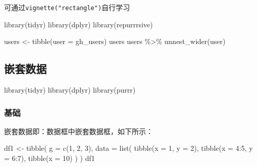 \documentclass[
]{book}
\newenvironment{Shaded}{\begin{snugshade}}{\end{snugshade}}
\newcommand{\AttributeTok}[1]{\textcolor[rgb]{0.77,0.63,0.00}{#1}}
\newcommand{\DecValTok}[1]{\textcolor[rgb]{0.00,0.00,0.81}{#1}}
\newcommand{\FunctionTok}[1]{\textcolor[rgb]{0.00,0.00,0.00}{#1}}
\newcommand{\NormalTok}[1]{#1}
\newcommand{\OtherTok}[1]{\textcolor[rgb]{0.56,0.35,0.01}{#1}}
\newcommand{\SpecialCharTok}[1]{\textcolor[rgb]{0.00,0.00,0.00}{#1}}
\begin{document}
可通过\texttt{vignette("rectangle")}自行学习

\begin{Shaded}
\begin{Highlighting}[]
\FunctionTok{library}\NormalTok{(tidyr)}
\FunctionTok{library}\NormalTok{(dplyr)}
\FunctionTok{library}\NormalTok{(repurrrsive)}
\end{Highlighting}
\end{Shaded}

\begin{Shaded}
\begin{Highlighting}[]
\NormalTok{users }\OtherTok{\textless{}{-}} \FunctionTok{tibble}\NormalTok{(}\AttributeTok{user =}\NormalTok{ gh\_users)}
\NormalTok{users}
\NormalTok{users }\SpecialCharTok{\%\textgreater{}\%} \FunctionTok{unnest\_wider}\NormalTok{(user)}
\end{Highlighting}
\end{Shaded}

\hypertarget{ux5d4cux5957ux6570ux636e}{%
\subsection{嵌套数据}\label{ux5d4cux5957ux6570ux636e}}

\begin{Shaded}
\begin{Highlighting}[]
\FunctionTok{library}\NormalTok{(tidyr)}
\FunctionTok{library}\NormalTok{(dplyr)}
\FunctionTok{library}\NormalTok{(purrr)}
\end{Highlighting}
\end{Shaded}

\hypertarget{ux57faux7840-3}{%
\subsubsection{基础}\label{ux57faux7840-3}}

嵌套数据即：数据框中嵌套数据框，如下所示：

\begin{Shaded}
\begin{Highlighting}[]
\NormalTok{df1 }\OtherTok{\textless{}{-}} \FunctionTok{tibble}\NormalTok{(}
  \AttributeTok{g =} \FunctionTok{c}\NormalTok{(}\DecValTok{1}\NormalTok{, }\DecValTok{2}\NormalTok{, }\DecValTok{3}\NormalTok{),}
  \AttributeTok{data =} \FunctionTok{list}\NormalTok{(}
    \FunctionTok{tibble}\NormalTok{(}\AttributeTok{x =} \DecValTok{1}\NormalTok{, }\AttributeTok{y =} \DecValTok{2}\NormalTok{),}
    \FunctionTok{tibble}\NormalTok{(}\AttributeTok{x =} \DecValTok{4}\SpecialCharTok{:}\DecValTok{5}\NormalTok{, }\AttributeTok{y =} \DecValTok{6}\SpecialCharTok{:}\DecValTok{7}\NormalTok{),}
    \FunctionTok{tibble}\NormalTok{(}\AttributeTok{x =} \DecValTok{10}\NormalTok{)}
\NormalTok{  )}
\NormalTok{)}
\NormalTok{df1}
\end{Highlighting}
\end{Shaded}
\end{document}
